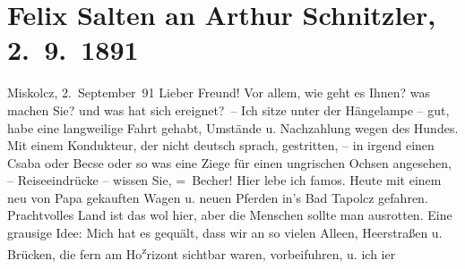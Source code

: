 

         
         \renewcommand{\erwaehntePersonen}{Personen: Bertha Karlsburg, Paula Makay, Philipp Salzmann, Michael Emil Salzmann, Ignaz Salzmann, Theodor Salzmann, Geza Sós}
         \renewcommand{\erwaehnteInstitutionen}{Institutionen: Danzer’s Orpheum}
         \renewcommand{\erwaehnteOrte}{Orte: Miskolc, Miskolctapolca, Mödling, Ungarn, Wien}
         \renewcommand{\erwaehnteWerke}{}
               \section[Felix Salten an Arthur Schnitzler, 2. 9. 1891]{ Felix Salten an Arthur Schnitzler, 2. 9. 1891}\nopagebreak{}\rehead{ }\begin{ledgroupsized}[t]{13cm}\normalsize\beginnumbering \toendnotes[C]{\smallbreak\pagebreak[2]} 
\toendnotes[C]{\smallbreak}\pstart
           \raggedleft{}{\pb}Miskolcz, 2. September 91\pend
           \pstart
           Lieber Freund! Vor allem, wie geht es Ihnen? was
               machen Sie? und was hat sich ereignet? –\pend
           \pstart
           Ich sitze unter der Hängelampe – gut, habe eine langweilige Fahrt gehabt, Umstände u.
               Nachzahlung wegen des Hundes. Mit einem Kondukteur, der nicht deutsch sprach,
               gestritten, – in irgend einen Csaba oder Becse oder so was eine Ziege für einen
               ungrischen Ochsen angesehen, – Reiseeindrücke – wissen Sie, = Becher!\pend
           \pstart
           {\pb}Hier lebe ich famos. Heute mit einem neu von Papa gekauften Wagen u. neuen Pferden in’s
                  Bad Tapolcz gefahren. Prachtvolles Land ist das wol hier, aber
               die Menschen sollte man ausrotten.\pend
           \pstart
           Eine grausige Idee: Mich hat es gequält, dass wir an so vielen Alleen, Heerstraßen u.
               Brücken,  die fern am Ho\substVorne{}\textsuperscript{z}\substDazwischen{}r\substHinten{}izont sichtbar waren, vorbeifuhren, u. ich i{\geminationm}er

\end{ledgroupsized}
